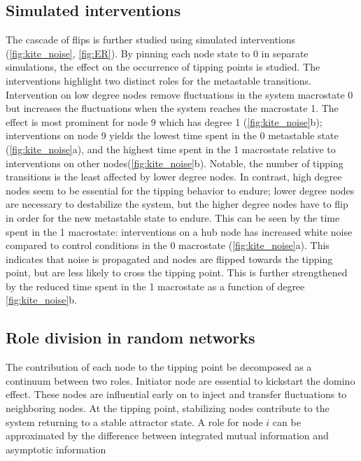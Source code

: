 \documentclass[a4paper, 11pt, twocolumn]{article}
\begin{document}
\subsection{Simulated interventions}
\label{sec:org7a8e8a1}
The  cascade of  flips  is further  studied using  simulated
interventions  (\cref{fig:kite_noise},   \cref{fig:ER}).  By
pinning each  node state to  0 in separate  simulations, the
effect on the  occurrence of tipping points  is studied. The
interventions   highlight  two   distinct   roles  for   the
metastable  transitions. Intervention  on  low degree  nodes
remove  fluctuations   in  the  system  macrostate   0  but
increases  the  fluctuations  when the  system  reaches  the
macrostate 1. The effect is  most prominent for node 9 which
has  degree 1  (\cref{fig:kite_noise}{b}); interventions  on
node  9 yields  the lowest  time spent  in the  0 metastable
state (\cref{fig:kite_noise}{a}), and the highest time spent
in  the  1 macrostate  relative  to  interventions on  other
nodes(\cref{fig:kite_noise}{b}).  Notable,   the  number  of
tipping transitions  is the  least affected by  lower degree
nodes. In contrast,  high degree nodes seem  to be essential
for the tipping  behavior to endure; lower  degree nodes are
necessary to  destabilize the system, but  the higher degree
nodes have to flip in order  for the new metastable state to
endure.  This  can be  seen  by  the  time  spent in  the  1
macrostate: interventions on a  hub node has increased white
noise  compared to  control conditions  in the  0 macrostate
(\cref{fig:kite_noise}{a}).  This  indicates that  noise  is
propagated and nodes are  flipped towards the tipping point,
but  are less  likely to  cross the  tipping point.  This is
further  strengthened by  the reduced  time spent  in the  1
macrostate as a function of degree \cref{fig:kite_noise}{b}.

\subsection{Role division in random networks}
\label{sec:orge2c054f}
The  contribution  of each  node  to  the tipping  point  be
decomposed as a continuum  between two roles. Initiator node
are essential  to kickstart  the domino effect.  These nodes
are influential early on to inject and transfer fluctuations
to  neighboring nodes.  At  the  tipping point,  stabilizing
nodes  contribute  to  the  system  returning  to  a  stable
attractor state. A role for  node \(i\) can be approximated by
the  difference between  integrated  mutual information  and
asymptotic information
\end{document}
